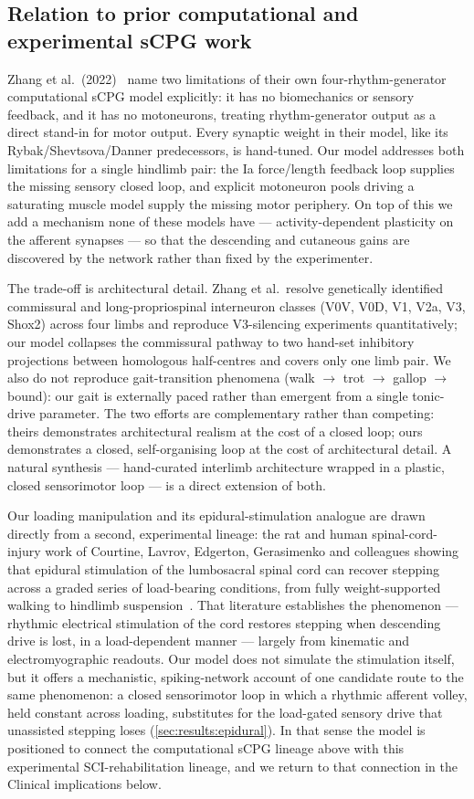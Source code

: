\subsection{Relation to prior computational and experimental sCPG work}
Zhang et al.\ (2022)~\cite{zhang2022} name two limitations of their own
four-rhythm-generator computational sCPG model explicitly: it has no
biomechanics or sensory feedback, and it has no motoneurons, treating
rhythm-generator output as a direct stand-in for motor output. Every
synaptic weight in their model, like its Rybak/Shevtsova/Danner
predecessors, is hand-tuned. Our model addresses both limitations for a
single hindlimb pair: the Ia force/length feedback loop supplies the
missing sensory closed loop, and explicit motoneuron pools driving a
saturating muscle model supply the missing motor periphery. On top of this
we add a mechanism none of these models have --- activity-dependent
plasticity on the afferent synapses --- so that the descending and
cutaneous gains are discovered by the network rather than fixed by the
experimenter.

The trade-off is architectural detail. Zhang et al.\ resolve genetically
identified commissural and long-propriospinal interneuron classes (V0V,
V0D, V1, V2a, V3, Shox2) across four limbs and reproduce V3-silencing
experiments quantitatively; our model collapses the commissural pathway to
two hand-set inhibitory projections between homologous half-centres and
covers only one limb pair. We also do not reproduce gait-transition
phenomena (walk $\to$ trot $\to$ gallop $\to$ bound): our gait is
externally paced rather than emergent from a single tonic-drive parameter.
The two efforts are complementary rather than competing: theirs
demonstrates architectural realism at the cost of a closed loop; ours
demonstrates a closed, self-organising loop at the cost of architectural
detail. A natural synthesis --- hand-curated interlimb architecture wrapped
in a plastic, closed sensorimotor loop --- is a direct extension of both.

Our loading manipulation and its epidural-stimulation analogue are drawn
directly from a second, experimental lineage: the rat and human
spinal-cord-injury work of Courtine, Lavrov, Edgerton, Gerasimenko and
colleagues showing that epidural stimulation of the lumbosacral spinal
cord can recover stepping across a graded series of load-bearing
conditions, from fully weight-supported walking to hindlimb
suspension~\cite{lavrov2008,edgerton2008,courtine2009,harkema2011}. That
literature establishes the phenomenon --- rhythmic electrical stimulation
of the cord restores stepping when descending drive is lost, in a
load-dependent manner --- largely from kinematic and electromyographic
readouts. Our model does not simulate the stimulation itself, but it
offers a mechanistic, spiking-network account of one candidate route to
the same phenomenon: a closed sensorimotor loop in which a rhythmic
afferent volley, held constant across loading, substitutes for the
load-gated sensory drive that unassisted stepping loses
(\autoref{sec:results:epidural}). In that sense the model is positioned to
connect the computational sCPG lineage above with this experimental
SCI-rehabilitation lineage, and we return to that connection in the
Clinical implications below.

